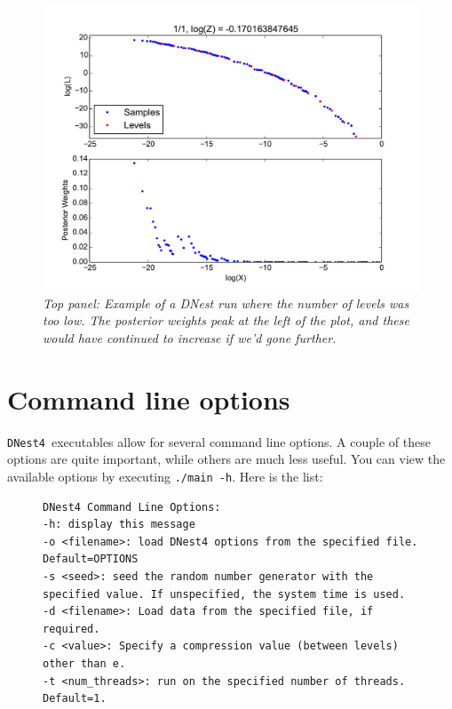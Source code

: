 \documentclass[a4paper, 11pt]{article}
\newcommand{\dnest}{{\tt DNest4}}
\begin{document}
\begin{figure}
\begin{center}
\includegraphics[scale=0.5]{not_enough_levels.pdf}
\caption{\it Top panel: Example of a DNest run where the number of levels
was too low. The posterior weights peak at the left of the plot, and these
would have continued to increase if we'd gone further.
\label{fig:not_enough_levels}}
\end{center}
\end{figure}

\section{Command line options}\label{sec:commandline}
\dnest~executables allow for several command line options. A couple of these
options are quite important, while others are much less useful.
You can view the available options by executing
{\tt ./main -h}. Here is the list:\\

\begin{figure}
\begin{framed}
\begin{verbatim}
DNest4 Command Line Options: 
-h: display this message
-o <filename>: load DNest4 options from the specified file. Default=OPTIONS
-s <seed>: seed the random number generator with the specified value. If unspecified, the system time is used.
-d <filename>: Load data from the specified file, if required.
-c <value>: Specify a compression value (between levels) other than e.
-t <num_threads>: run on the specified number of threads. Default=1.
\end{verbatim}
\end{framed}
\end{figure}
\end{document}
